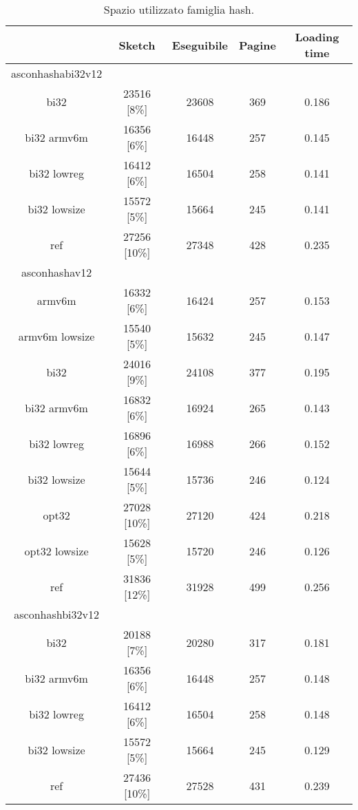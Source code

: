 \begin{table}[h]
    \caption{Spazio utilizzato famiglia hash.}
    \centering
	\begin{tabular}{|c|c|c|c|c|}
		\hline
         & Sketch & Eseguibile & Pagine & Loading time \\
        \hline
        asconhashabi32v12 & & & & \\
        \hline
        bi32 & 23516 [8\%] & 23608 & 369 & 0.186 \\
        \hline
        bi32 armv6m & 16356 [6\%] & 16448 & 257 & 0.145 \\
        \hline
        bi32 lowreg & 16412 [6\%] & 16504 & 258 & 0.141 \\
        \hline
        bi32 lowsize & 15572 [5\%] & 15664 & 245 & 0.141 \\
        \hline
        ref & 27256 [10\%] & 27348 & 428 & 0.235 \\
        \hline
        asconhashav12 & & & & \\
        \hline
        armv6m & 16332 [6\%] & 16424 & 257 & 0.153 \\
        \hline
        armv6m lowsize & 15540 [5\%] & 15632 & 245 & 0.147 \\
        \hline
        bi32 & 24016 [9\%] & 24108 & 377 & 0.195 \\
        \hline
        bi32 armv6m & 16832 [6\%] & 16924 & 265 & 0.143 \\
        \hline
        bi32 lowreg & 16896 [6\%] & 16988 & 266 & 0.152 \\
        \hline
        bi32 lowsize & 15644 [5\%] & 15736 & 246 & 0.124 \\
        \hline
        opt32 & 27028 [10\%] & 27120 & 424 & 0.218 \\
        \hline
        opt32 lowsize & 15628 [5\%] & 15720 & 246 & 0.126 \\
        \hline
        ref & 31836 [12\%] & 31928 & 499 & 0.256 \\
        \hline
        asconhashbi32v12 & & & & \\
        \hline
        bi32 & 20188 [7\%] & 20280 & 317 & 0.181 \\
        \hline
        bi32 armv6m & 16356 [6\%] & 16448 & 257 & 0.148 \\
        \hline
        bi32 lowreg & 16412 [6\%] & 16504 & 258 & 0.148 \\
        \hline
        bi32 lowsize & 15572 [5\%] & 15664 & 245 & 0.129 \\
        \hline
        ref & 27436 [10\%] & 27528 & 431 & 0.239 \\

\end{tabular}
\end{table}
